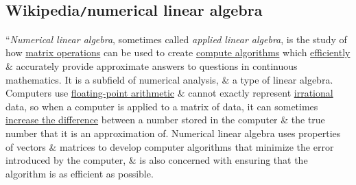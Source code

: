 \documentclass{article}
\begin{document}

\subsection{Wikipedia{\tt/}numerical linear algebra}
``{\it Numerical linear algebra}, sometimes called {\it applied linear algebra}, is the study of how \href{https://en.wikipedia.org/wiki/Matrix_operation}{matrix operations} can be used to create \href{https://en.wikipedia.org/wiki/Algorithms}{compute algorithms} which \href{https://en.wikipedia.org/wiki/Algorithmic_efficiency}{efficiently} \& accurately provide approximate answers to questions in continuous mathematics. It is a subfield of numerical analysis, \& a type of linear algebra. Computers use \href{https://en.wikipedia.org/wiki/Floating-point_arithmetic}{floating-point arithmetic} \& cannot exactly represent \href{https://en.wikipedia.org/wiki/Irrational_number}{irrational} data, so when a computer is applied to a matrix of data, it can sometimes \href{https://en.wikipedia.org/wiki/Propagation_of_uncertainty}{increase the difference} between a number stored in the computer \& the true number that it is an approximation of. Numerical linear algebra uses properties of vectors \& matrices to develop computer algorithms that minimize the error introduced by the computer, \& is also concerned with ensuring that the algorithm is as efficient as possible.
\end{document}
